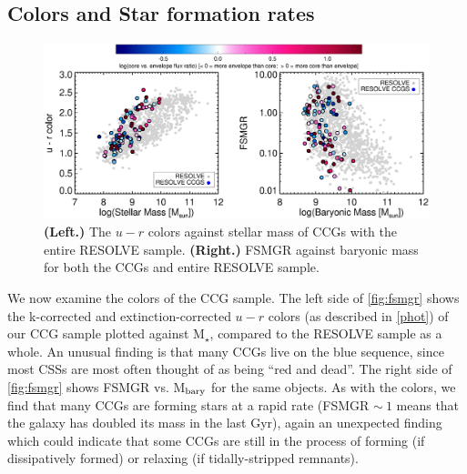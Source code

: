 \documentclass[iop,apj]{emulateapj}
\begin{document}
\subsection{Colors and Star formation rates}

\begin{figure}[hbpt!]
\begin{center}
\includegraphics[scale=0.65]{sfr_mbary.eps}
\caption{\textbf{(Left.)} The $u-r$ colors against stellar mass of CCGs with the entire RESOLVE sample. \textbf{(Right.)} FSMGR against baryonic mass for both the CCGs and entire RESOLVE sample.}
\label{fig:fsmgr}
\end{center}
\end{figure}

 We now examine the colors of the CCG sample. The left side of \autoref{fig:fsmgr} shows the k-corrected and extinction-corrected $u-r$ colors (as described in \autoref{phot}) of our CCG sample plotted against M$_{\star}$, compared to the RESOLVE sample as a whole. An unusual finding is that many CCGs live on the blue sequence, since most CSSs are most often thought of as being ``red and dead''. The right side of \autoref{fig:fsmgr} shows FSMGR vs. M$_{\rm bary}$ for the same objects. As with the colors, we find that many CCGs are forming stars at a rapid rate (FSMGR $\sim~1$ means that the galaxy has doubled its mass in the last Gyr), again an unexpected finding which could indicate that some CCGs are still in the process of forming (if dissipatively formed) or relaxing (if tidally-stripped remnants).

\end{document}
